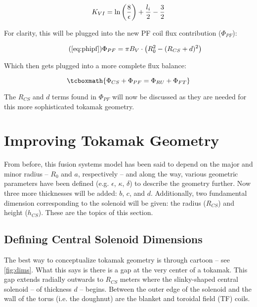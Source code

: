 \begin{equation}
	K_{VI} = \textnormal{ln} \left(\frac{8}{\epsilon}\right) + \frac{l_i}{2} - \frac{3}{2}
\end{equation}

For clarity, this will be plugged into the new PF coil flux contribution ($\Phi_{PF}$):

\begin{equation}
	\tag{\ref{eq:phipf}}
	\Phi_{PF} = \pi B_V \cdot \left( R_0^2 - ( R_{CS} + d ) ^ 2 \right)
\end{equation}

Which then gets plugged into a more complete flux balance:

\begin{equation}
	\label{eq:full_ibal}
	\tcboxmath{
		\Phi_{CS} + \Phi_{PF} = \Phi_{RU} + \Phi_{FT}
	}
\end{equation}

The $R_{CS}$ and $d$ terms found in $\Phi_{PF}$ will now be discussed as they are needed for this more sophisticated tokamak geometry.

\section{Improving Tokamak Geometry}

From before, this fusion systems model has been said to depend on the major and minor radius -- $R_0$ and $a$, respectively -- and along the way, various geometric parameters have been defined (e.g. $\epsilon$, $\kappa$, $\delta$) to describe the geometry further. Now three more thicknesses will be added: $b$, $c$, and $d$. Additionally, two fundamental dimension corresponding to the solenoid will be given: the radius ($R_{CS}$) and height ($h_{CS}$). These are the topics of this section.

\subsection{Defining Central Solenoid Dimensions}

The best way to conceptualize tokamak geometry is through cartoon -- see \cref{fig:dims}. What this says is there is a gap at the very center of a tokamak. This gap extends radially outwards to $R_{CS}$ meters where the slinky-shaped central solenoid -- of thickness $d$ -- begins. Between the outer edge of the solenoid and the wall of the torus (i.e. the doughnut) are the blanket and toroidal field (TF) coils.

